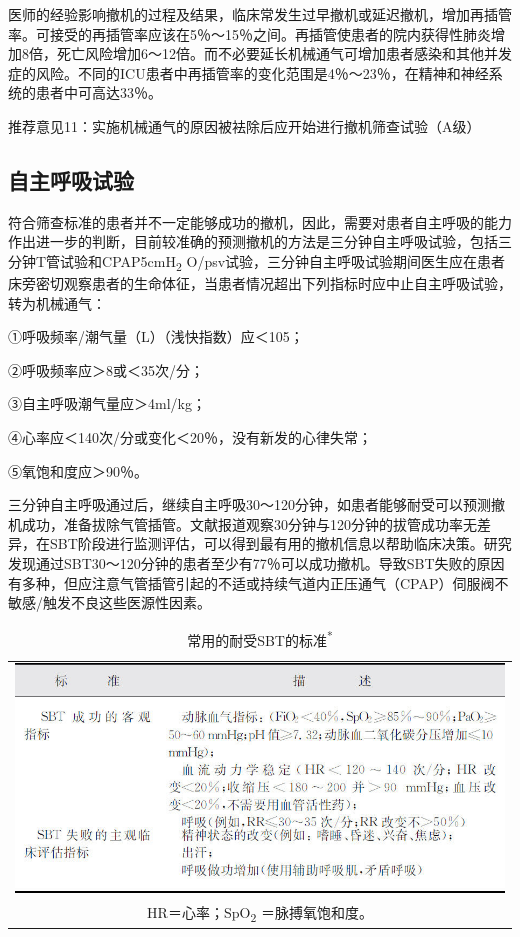 医师的经验影响撤机的过程及结果，临床常发生过早撤机或延迟撤机，增加再插管率。可接受的再插管率应该在5％～15％之间。再插管使患者的院内获得性肺炎增加8倍，死亡风险增加6～12倍。而不必要延长机械通气可增加患者感染和其他并发症的风险。不同的ICU患者中再插管率的变化范围是4％～23％，在精神和神经系统的患者中可高达33％。

推荐意见11：实施机械通气的原因被袪除后应开始进行撤机筛查试验（A级）

\subsection{自主呼吸试验}

符合筛查标准的患者并不一定能够成功的撤机，因此，需要对患者自主呼吸的能力作出进一步的判断，目前较准确的预测撤机的方法是三分钟自主呼吸试验，包括三分钟T管试验和CPAP5cmH\textsubscript{2}
O/psv试验，三分钟自主呼吸试验期间医生应在患者床旁密切观察患者的生命体征，当患者情况超出下列指标时应中止自主呼吸试验，转为机械通气：

①呼吸频率/潮气量（L）（浅快指数）应＜105；

②呼吸频率应＞8或＜35次/分；

③自主呼吸潮气量应＞4ml/kg；

④心率应＜140次/分或变化＜20％，没有新发的心律失常；

⑤氧饱和度应＞90％。

三分钟自主呼吸通过后，继续自主呼吸30～120分钟，如患者能够耐受可以预测撤机成功，准备拔除气管插管。文献报道观察30分钟与120分钟的拔管成功率无差异，在SBT阶段进行监测评估，可以得到最有用的撤机信息以帮助临床决策。研究发现通过SBT30～120分钟的患者至少有77％可以成功撤机。导致SBT失败的原因有多种，但应注意气管插管引起的不适或持续气道内正压通气（CPAP）伺服阀不敏感/触发不良这些医源性因素。
　
\begin{longtable}{c}
  \caption{常用的耐受SBT的标准\textsuperscript{*}}
  \label{tabapp-7}
  \endfirsthead
  \caption[]{常用的耐受SBT的标准\textsuperscript{*}}
  \endhead
\includegraphics[width=\textwidth,height=\textheight,keepaspectratio]{./images/Image00305.jpg}\\
\footnotesize * HR＝心率；SpO\textsubscript{2} ＝脉搏氧饱和度。
\end{longtable}




